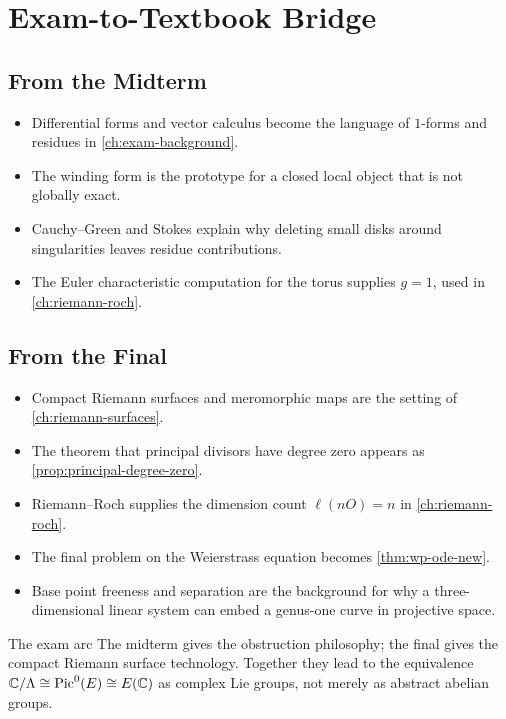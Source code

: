 \chapter{Exam-to-Textbook Bridge}
\label{app:exam-bridge}

\section{From the Midterm}

\begin{itemize}
\item Differential forms and vector calculus become the language of \(1\)-forms
  and residues in \cref{ch:exam-background}.
\item The winding form is the prototype for a closed local object that is not
  globally exact.
\item Cauchy--Green and Stokes explain why deleting small disks around
  singularities leaves residue contributions.
\item The Euler characteristic computation for the torus supplies \(g=1\), used
  in \cref{ch:riemann-roch}.
\end{itemize}

\section{From the Final}

\begin{itemize}
\item Compact Riemann surfaces and meromorphic maps are the setting of
  \cref{ch:riemann-surfaces}.
\item The theorem that principal divisors have degree zero appears as
  \cref{prop:principal-degree-zero}.
\item Riemann--Roch supplies the dimension count \(\ell(nO)=n\) in
  \cref{ch:riemann-roch}.
\item The final problem on the Weierstrass equation becomes
  \cref{thm:wp-ode-new}.
\item Base point freeness and separation are the background for why a
  three-dimensional linear system can embed a genus-one curve in projective
  space.
\end{itemize}

\begin{keyidea}{The exam arc}
The midterm gives the obstruction philosophy; the final gives the compact
Riemann surface technology.  Together they lead to the equivalence
\(\mathbb{C}/\Lambda\cong\operatorname{Pic}^0(E)\cong E(\mathbb{C})\) as complex Lie groups, not merely as
abstract abelian groups.
\end{keyidea}

